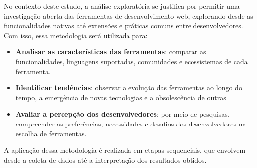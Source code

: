 No contexto deste estudo, a análise exploratória se justifica por permitir uma investigação aberta das ferramentas de desenvolvimento web, explorando desde as funcionalidades nativas até extensões e práticas comuns entre desenvolvedores. Com isso, essa metodologia será utilizada para:

\begin{itemize}
    \item \textbf{Analisar as características das ferramentas}: comparar as funcionalidades, linguagens suportadas, comunidades e ecossistemas de cada ferramenta.
    \item \textbf{Identificar tendências}: observar a evolução das ferramentas ao longo do tempo, a emergência de novas tecnologias e a obsolescência de outras
    \item \textbf{Avaliar a percepção dos desenvolvedores}: por meio de pesquisas, compreender as preferências, necessidades e desafios dos desenvolvedores na escolha de ferramentas.
\end{itemize}

A aplicação dessa metodologia é realizada em etapas sequenciais, que envolvem desde a coleta de dados até a interpretação dos resultados obtidos.
